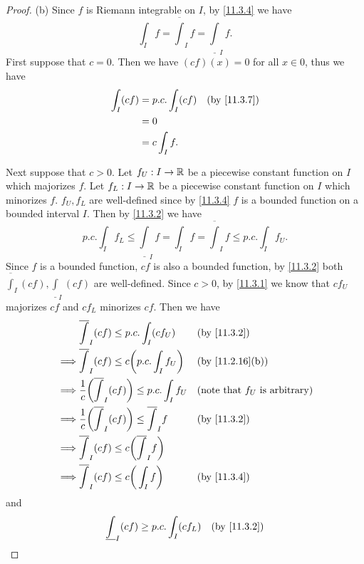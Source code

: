 \begin{proof}{(b)}
  Since \(f\) is Riemann integrable on \(I\), by \cref{11.3.4} we have
  \[
    \int_I f = \overline{\int}_I f = \underline{\int}_I f.
  \]
  First suppose that \(c = 0\).
  Then we have \((cf)(x) = 0\) for all \(x \in 0\), thus we have
  \begin{align*}
    \int_I (cf) & = p.c. \int_I (cf) &  & \by{11.3.7} \\
                & = 0                                 \\
                & = c \int_I f.
  \end{align*}

  Next suppose that \(c > 0\).
  Let \(f_U : I \to \mathbb{R}\) be a piecewise constant function on \(I\) which majorizes \(f\).
  Let \(f_L : I \to \mathbb{R}\) be a piecewise constant function on \(I\) which minorizes \(f\).
  \(f_U, f_L\) are well-defined since by \cref{11.3.4} \(f\) is a bounded function on a bounded interval \(I\).
  Then by \cref{11.3.2} we have
  \[
    p.c. \int_I f_L \leq \underline{\int}_I f = \int_I f = \overline{\int}_I f \leq p.c. \int_I f_U.
  \]
  Since \(f\) is a bounded function, \(cf\) is also a bounded function, by \cref{11.3.2} both \(\overline{\int}_I (cf), \underline{\int}_I (cf)\) are well-defined.
  Since \(c > 0\), by \cref{11.3.1} we know that \(c f_U\) majorizes \(c f\) and \(c f_L\) minorizes \(c f\).
  Then we have
  \begin{align*}
             & \overline{\int}_I (cf) \leq p.c. \int_I (c f_U)                          &  & \by{11.3.2}                             \\
    \implies & \overline{\int}_I (cf) \leq c \bigg(p.c. \int_I f_U\bigg)                &  & \text{(by \cref{11.2.16}(b))}           \\
    \implies & \dfrac{1}{c} \bigg(\overline{\int}_I (cf)\bigg) \leq p.c. \int_I f_U     &  & \text{(note that \(f_U\) is arbitrary)} \\
    \implies & \dfrac{1}{c} \bigg(\overline{\int}_I (cf)\bigg) \leq \overline{\int}_I f &  & \by{11.3.2}                             \\
    \implies & \overline{\int}_I (cf) \leq c\bigg(\overline{\int}_I f\bigg)                                                          \\
    \implies & \overline{\int}_I (cf) \leq c\bigg(\int_I f\bigg)                        &  & \by{11.3.4}
  \end{align*}
  and
  \begin{align*}
             & \underline{\int}_I (cf) \geq p.c. \int_I (c f_L)                           &  & \by{11.3.2}                             \\

\end{align*}
\end{proof}
